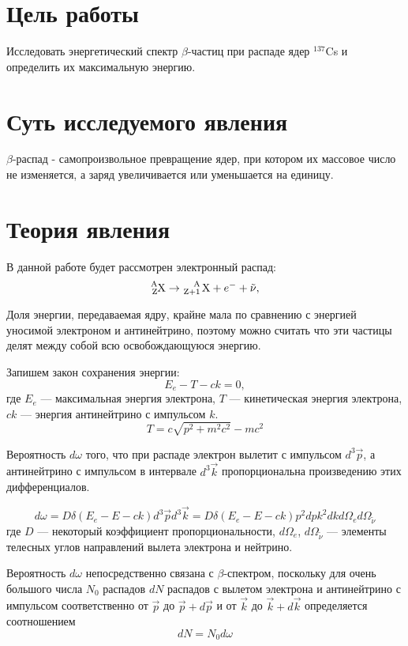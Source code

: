 \documentclass[a4paper, 12pt]{article}
\begin{document}

\section{Цель работы}
Исследовать энергетический спектр $\beta$-частиц при распаде ядер
$ ^{137}$Cs и определить их максимальную энергию.

\section{Суть исследуемого явления}
$\beta$-распад - самопроизвольное превращение ядер, при котором их
массовое число не изменяется, а заряд увеличивается или уменьшается на
единицу.


\section{Теория явления}
В данной работе будет рассмотрен электронный распад:
\[
    \ce{^{A}_{Z}X} \rightarrow \ce{^{A}_{Z+1} X} + e ^{-} + \tilde
    \nu,
\]

Доля энергии, передаваемая ядру, крайне мала по сравнению с энергией
уносимой электроном и антинейтрино, поэтому можно считать что эти
частицы делят между собой всю освобождающуюся энергию.

Запишем закон сохранения энергии:
\begin{equation}
    E_e - T - ck = 0,
    \label{eq:1}
\end{equation}
где $E_e$ --- максимальная энергия электрона, $T$ --- кинетическая
энергия электрона, $ck$ --- энергия
антинейтрино с импульсом $k$. 
\begin{equation}
    T = c \sqrt{p^2 + m^2c^2} - mc^2
    \label{eq:2}
\end{equation}

Вероятность $d \omega$ того, что при распаде электрон вылетит с
импульсом $d^3 \vec{p}$, а антинейтрино с импульсом в интервале $d^3
\vec{k}$ пропорциональна произведению этих дифференциалов.

\begin{equation}
    d \omega = D \delta (E_e - E -ck) d^3 \vec{p} d^3 \vec{k} = D
    \delta (E_e - E - ck)p^2 dp k^2 dk d\Omega_e d\Omega _{\tilde \nu}
    \label{eq:3}
\end{equation}
где $D$ --- некоторый коэффициент пропорциональности, $d\Omega_e$,
$d\Omega _{\tilde \nu}$ --- элементы телесных углов направлений вылета
электрона и нейтрино.

Вероятность $d\omega$ непосредственно связана с
$\beta$-спектром, поскольку для очень большого числа $N_0$ распадов
$dN$ распадов с вылетом электрона и антинейтрино с импульсом
соответственно от $\vec{p}$ до $\vec{p} + d \vec{p}$ и от $\vec{k}$ до
$\vec{k} + d \vec{k}$ определяется соотношением
\begin{equation}
    dN = N_0 d \omega
    \label{eq:4}
\end{equation}
\end{document}
